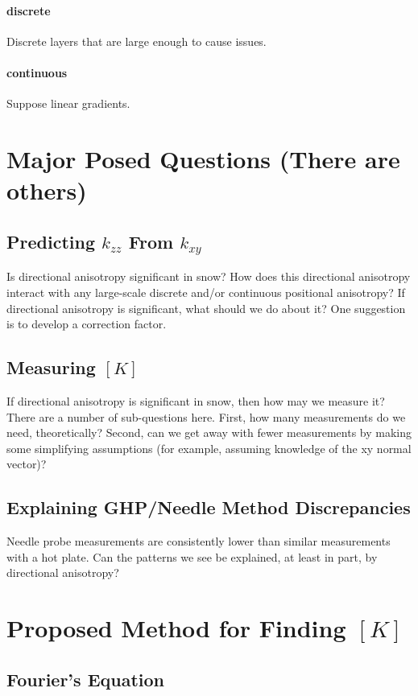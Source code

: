 \documentclass[10pt, letterpaper]{article}
\begin{document}
          \paragraph{discrete}
            Discrete layers that are large enough to cause issues.
          \paragraph{continuous}
            Suppose linear gradients.
    \section{Major Posed Questions (There are others)}
      \subsection{Predicting \(k_{zz}\) From \(k_{xy}\)}
Is directional anisotropy significant in snow? How does this directional anisotropy interact with any large-scale discrete and/or continuous positional anisotropy? 
If directional anisotropy is significant, what should we do about it? One suggestion is to develop a correction factor.
      \subsection{Measuring \([K]\)}
        If directional anisotropy is significant in snow, then how may we measure it? There are a number of sub-questions here. First, how many measurements do we need, theoretically? Second, can we get away with fewer measurements by making some simplifying assumptions (for example, assuming knowledge of the xy normal vector)?
      \subsection{Explaining GHP/Needle Method Discrepancies}
        Needle probe measurements are consistently lower than similar measurements with a hot plate. Can the patterns we see be explained, at least in part, by directional anisotropy?
    \section{Proposed Method for Finding \([K]\)}
      \subsection{Fourier's Equation}
\end{document}
